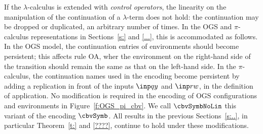 If the  $\lambda$-calculus  is extended with 
\emph{control operators},  the linearity on the manipulation of 
the continuation  of a $\lambda$-term does not hold: the continuation  may be dropped or
duplicated, an arbitrary number of times. 
In the OGS and $\pi$-calculus representations in Sections~\ref{s:} and \ref{...}, this is
accommodated as follows. In the OGS model,  
  the continuation entries of environments should become persistent; this affects
  rule OA, wher  the environment   on the right-hand side of the transition should remain
  the same as that on the  left-hand side. 
 In the $\pi$-calculus,  the continuation
names used in the encoding  become persistent 
by adding a replication in front of the inputs 
 $\inp q y$ and  $ \inp r w$, in the definition  of application.   
No modification is required in the encoding of OGS configurations and environments in
Figure~\ref{f:OGS_pi_cbv}. 
We call $\cbvSymbNoLin$ this variant of the encoding 
   $\cbvSymb$.  
All results in the previous Sections~\ref{s:..}, in particular Theorem~\ref{t:} and \ref{????}, 
continue to hold   under these modifications. 

\fi
